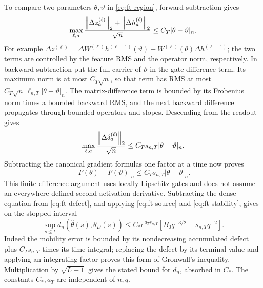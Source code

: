 To compare two parameters $\theta,\vartheta$ in
\eqref{eq:ft-region}, forward subtraction gives
\[
 \max_{\ell,a}\frac{\left\lVert \Delta z_a^{(\ell)}\right\rVert_2+
                         \left\lVert \Delta h_a^{(\ell)}\right\rVert_2}{\sqrt n}
       \le C_T|\theta-\vartheta|_n.
\]
For example
$\Delta z^{(\ell)}=\Delta W^{(\ell)}h^{(\ell-1)}(\vartheta)
+W^{(\ell)}(\theta)\Delta h^{(\ell-1)}$; the two terms are controlled
by the feature RMS and the operator norm, respectively.
In backward subtraction put the full carrier of $\vartheta$ in the
gate-difference term.  Its maximum norm is at most $C_T\sqrt n$, so
that term has RMS at most
$C_T\sqrt n\,\ell_{n,T}|\theta-\vartheta|_n$.
The matrix-difference term is bounded by its Frobenius norm times a
bounded backward RMS, and the next backward difference propagates
through bounded operators and slopes.  Descending from the readout gives
\[
 \max_{\ell,a}\frac{\left\lVert \Delta\delta_a^{(\ell)}\right\rVert_2}{\sqrt n}
       \le C_Ts_{n,T}|\theta-\vartheta|_n.
\]
Subtracting the canonical gradient formulas one factor at a time now
proves
\begin{equation}
 |F(\theta)-F(\vartheta)|_n
       \le C_Ts_{n,T}|\theta-\vartheta|_n.
 \label{eq:ft-stability}
\end{equation}
This finite-difference argument uses locally Lipschitz gates and does
not assume an everywhere-defined second activation derivative.
Subtracting the dense equation from \eqref{eq:ft-defect}, and applying
\eqref{eq:ft-source} and \eqref{eq:ft-stability}, gives on the stopped
interval
\begin{equation}
 \sup_{s\le t}d_n(\widehat\theta(s),\theta_D(s))
 \le C_*e^{a_Ts_{n,T}}
          \left[B_0q^{-3/2}+s_{n,T}q^{-2}\right].
 \label{eq:ft-stopped}
\end{equation}
Indeed the mobility error is bounded by its nondecreasing accumulated defect
plus $C_Ts_{n,T}$ times its time integral; replacing the defect by its
terminal value and applying an integrating factor proves this form of
Gronwall's inequality.  Multiplication by $\sqrt{L+1}$ gives the stated
bound for $d_n$, absorbed in $C_*$.  The constants $C_*,a_T$ are
independent of $n,q$.

